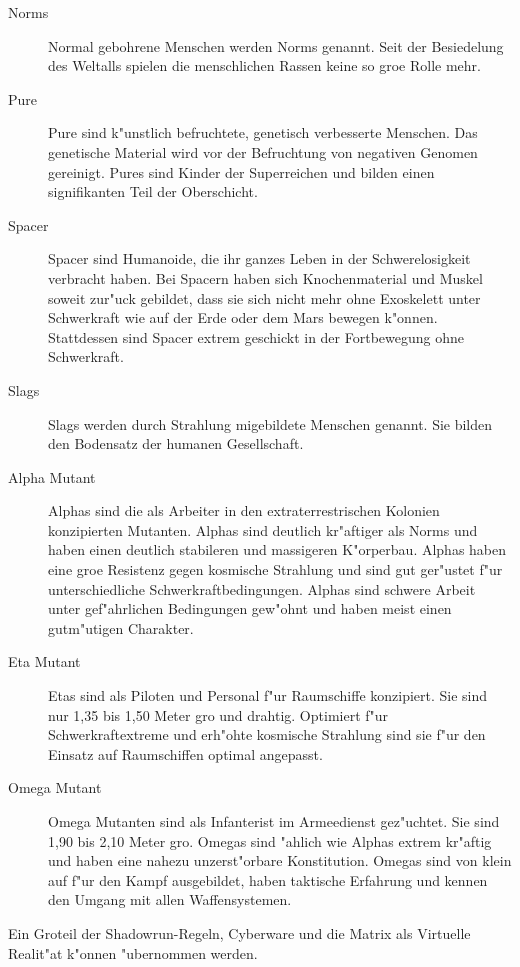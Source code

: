 \begin{description}
\item [Norms] Normal gebohrene Menschen werden Norms genannt. Seit der Besiedelung des Weltalls spielen die
      menschlichen Rassen keine so gro\3e Rolle mehr.
\item [Pure] Pure sind k"unstlich befruchtete, genetisch verbesserte Menschen. Das genetische Material wird vor der
      Befruchtung von negativen Genomen gereinigt. Pures sind Kinder der Superreichen und bilden einen signifikanten Teil der Oberschicht.
\item [Spacer] Spacer sind Humanoide, die ihr ganzes Leben in der Schwerelosigkeit verbracht haben. Bei Spacern haben
      sich Knochenmaterial und Muskel soweit zur"uck gebildet, dass sie sich nicht mehr ohne Exoskelett unter Schwerkraft wie auf der Erde oder dem Mars bewegen k"onnen. Stattdessen sind Spacer extrem geschickt in der Fortbewegung ohne Schwerkraft.
\item [Slags] Slags werden durch Strahlung mi\3gebildete Menschen genannt. Sie bilden den Bodensatz der
      humanen Gesellschaft.
\item [Alpha Mutant] Alphas sind die als Arbeiter in den extraterrestrischen Kolonien konzipierten Mutanten.
      Alphas sind deutlich kr"aftiger als Norms und haben einen deutlich stabileren und massigeren K"orperbau. Alphas haben eine gro\3e Resistenz gegen kosmische Strahlung und sind gut ger"ustet f"ur unterschiedliche Schwerkraftbedingungen. Alphas sind schwere Arbeit unter gef"ahrlichen Bedingungen gew"ohnt und haben meist einen gutm"utigen Charakter.
\item [Eta Mutant] Etas sind als Piloten und Personal f"ur Raumschiffe konzipiert. Sie sind nur 1,35 bis 1,50 Meter gro\3
      und drahtig. Optimiert f"ur Schwerkraftextreme und erh"ohte kosmische Strahlung sind sie f"ur den Einsatz auf Raumschiffen optimal angepasst.
\item [Omega Mutant] Omega Mutanten sind als Infanterist im Armeedienst gez"uchtet. Sie sind 1,90 bis 2,10 Meter gro\3.
      Omegas sind "ahlich wie Alphas extrem kr"aftig und haben eine nahezu unzerst"orbare Konstitution. Omegas sind von klein auf f"ur den Kampf ausgebildet, haben taktische Erfahrung und kennen den Umgang mit allen Waffensystemen.
\end{description}


Ein Gro\3teil der Shadowrun-Regeln, Cyberware und die Matrix als Virtuelle Realit"at k"onnen "ubernommen werden.

